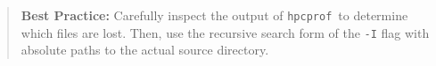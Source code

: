 \documentclass{article}
\newcommand{\hpcprof}{\texttt{hpcprof}}
\begin{document}
\begin{quote}
\begin{comment}
  The best practice is to always use -I to do a recursive search
  starting at the top of your each distinct source (or build, if
  separate) directory.  (E.g. in the case of Chroma, which uses 3 or 4
  separate packages, you would need 3 or 4 -Is.)

  As long as one doesn't have a crazy source tree where symbolic links
  create cycles, this will be the right thing 99%
---
  John Again

  OK. I'm fine with Nathan's suggestion, but the language has to be
  written carefully so that others know what he means and not just
  us. What I wanted to make clear was that we don't want to specify
  "absolute paths to the actual source directory". What we want is to
  specify absolute paths to the top of each distinct source or build
  directory tree within which the relative path names to the lost
  files can be resolved.
\end{comment}

\textbf{Best Practice:} Carefully inspect the output of \hpcprof\ to
determine which files are lost.  Then, use the recursive search form
of the \verb|-I| flag with absolute paths to the actual source
directory.
\end{quote}

\begin{comment}
   possible question: What happens if I forget to run hpcstruct?  
No hpcstruct = 
   really crazy procedure & loop bounds
   no inlining detection!
\end{comment}
\end{document}
